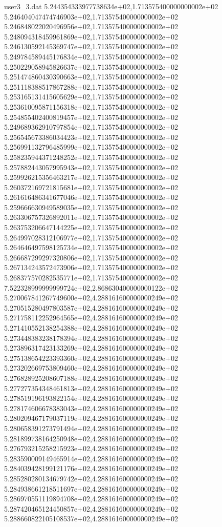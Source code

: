 \begin{filecontents}{user3_3.dat}
5.244354333977738634e+02,1.713575400000000002e+02
5.246404047474746903e+02,1.713575400000000002e+02
5.246848022020496956e+02,1.713575400000000002e+02
5.248094318459961869e+02,1.713575400000000002e+02
5.246130592145369747e+02,1.713575400000000002e+02
5.249784589445176834e+02,1.713575400000000002e+02
5.250229058945826637e+02,1.713575400000000002e+02
5.251474860430390663e+02,1.713575400000000002e+02
5.251118388517867288e+02,1.713575400000000002e+02
5.253165131415605629e+02,1.713575400000000002e+02
5.253610095871156318e+02,1.713575400000000002e+02
5.254855402400819457e+02,1.713575400000000002e+02
5.249689362910797854e+02,1.713575400000000002e+02
5.256545673386034423e+02,1.713575400000000002e+02
5.256991132796485999e+02,1.713575400000000002e+02
5.258235944371248252e+02,1.713575400000000002e+02
5.257882443057995943e+02,1.713575400000000002e+02
5.259926215356463217e+02,1.713575400000000002e+02
5.260372169721815681e+02,1.713575400000000002e+02
5.261616486341677046e+02,1.713575400000000002e+02
5.259666630949589035e+02,1.713575400000000002e+02
5.263306757326892011e+02,1.713575400000000002e+02
5.263753206647144225e+02,1.713575400000000002e+02
5.264997028312106977e+02,1.713575400000000002e+02
5.264646497598125734e+02,1.713575400000000002e+02
5.266687299297320806e+02,1.713575400000000002e+02
5.267134243572473906e+02,1.713575400000000002e+02
5.268377570282535771e+02,1.713575400000000002e+02
7.522328999999999724e+02,2.868630400000000122e+02
5.270067841267749600e+02,4.288161600000000249e+02
5.270515280497803587e+02,4.288161600000000249e+02
5.271758112252964565e+02,4.288161600000000249e+02
5.271410552138254388e+02,4.288161600000000249e+02
5.273448383238178394e+02,4.288161600000000249e+02
5.273896317423133269e+02,4.288161600000000249e+02
5.275138654223393360e+02,4.288161600000000249e+02
5.273202669753809460e+02,4.288161600000000249e+02
5.276828925208607188e+02,4.288161600000000249e+02
5.277277354348461813e+02,4.288161600000000249e+02
5.278519196193822154e+02,4.288161600000000249e+02
5.278174606678383043e+02,4.288161600000000249e+02
5.280209467179037119e+02,4.288161600000000249e+02
5.280658391273791494e+02,4.288161600000000249e+02
5.281899738164250948e+02,4.288161600000000249e+02
5.276793215258215923e+02,4.288161600000000249e+02
5.283590009149465914e+02,4.288161600000000249e+02
5.284039428199121176e+02,4.288161600000000249e+02
5.285280280134679742e+02,4.288161600000000249e+02
5.284938661218511697e+02,4.288161600000000249e+02
5.286970551119894708e+02,4.288161600000000249e+02
5.287420465124450857e+02,4.288161600000000249e+02
5.288660822105108537e+02,4.288161600000000249e+02

\end{filecontents}
